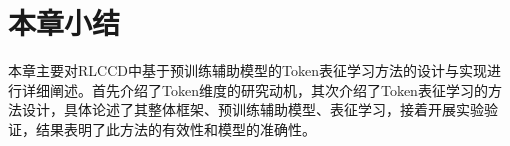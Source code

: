 \section{本章小结}
\label{sec:Summary3}
本章主要对RLCCD中基于预训练辅助模型的Token表征学习方法的设计与实现进行详细阐述。首先介绍了Token维度的研究动机，其次介绍了Token表征学习的方法设计，具体论述了其整体框架、预训练辅助模型、表征学习，接着开展实验验证，结果表明了此方法的有效性和模型的准确性。
